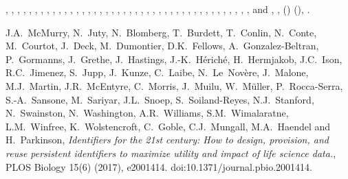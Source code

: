 \documentclass[ds,v1.1.2,openaccess]{iosart2x}%
\begin{document}
\begin{thebibliography}{}
%
\begin{barticle}
,
,
,
,
,
,
,
,
,
,
,
,
,
,
,
,
,
,
,
,
,
,
,
,
,
,
,
,
,
,
,
,
,
,
,
,
,
,
,
,
,
,
 and
,
,
()
(),
.
\end{barticle}
%
\OrigBibText
J.A.~{McMurry},
N.~Juty,
N.~Blomberg,
T.~Burdett,
T.~Conlin,
N.~Conte,
M.~Courtot,
J.~Deck,
M.~Dumontier,
D.K.~Fellows,
A.~Gonzalez-Beltran,
P.~Gormanns,
J.~Grethe,
J.~Hastings,
J.-K.~H\'{e}rich\'{e},
H.~Hermjakob,
J.C.~Ison,
R.C.~Jimenez,
S.~Jupp,
J.~Kunze,
C.~Laibe,
N.~Le~Nov\`{e}re,
J.~Malone,
M.J.~Martin,
J.R.~{McEntyre},
C.~Morris,
J.~Muilu,
W.~M\"{u}ller,
P.~Rocca-Serra,
S.-A.~Sansone,
M.~Sariyar,
J.L.~Snoep,
S.~Soiland-Reyes,
N.J.~Stanford,
N.~Swainston,
N.~Washington,
A.R.~Williams,
S.M.~Wimalaratne,
L.M.~Winfree,
K.~Wolstencroft,
C.~Goble,
C.J.~Mungall,
M.A.~Haendel and
H.~Parkinson,
\textit{Identifiers for the 21st century: How to design, provision, and reuse
persistent identifiers to maximize utility and impact of life science data.},
{PLOS} Biology
15(6)
(2017),
e2001414.
doi:10.1371/journal.pbio.2001414.
\endOrigBibText
{}
\endbibitem


\end{thebibliography}
\end{document}
